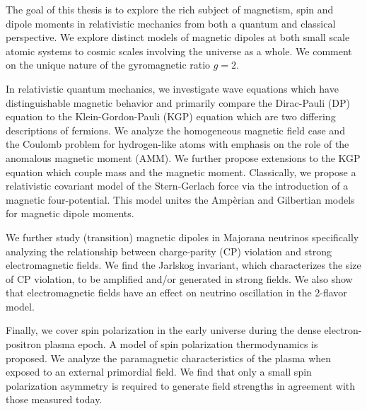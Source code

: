 

The goal of this thesis is to explore the rich subject of magnetism, spin and dipole moments in relativistic mechanics from both a quantum and classical perspective. We explore distinct models of magnetic dipoles at both small scale atomic systems to cosmic scales involving the universe as a whole. We comment on the unique nature of the gyromagnetic ratio $g=2$.

In relativistic quantum mechanics, we investigate wave equations which have distinguishable magnetic behavior and primarily compare the Dirac-Pauli (DP) equation to the Klein-Gordon-Pauli (KGP) equation which are two differing descriptions of fermions. We analyze the homogeneous magnetic field case and the Coulomb problem for hydrogen-like atoms with emphasis on the role of the anomalous magnetic moment (AMM). We further propose extensions to the KGP equation which couple mass and the magnetic moment. Classically, we propose a relativistic covariant model of the Stern-Gerlach force via the introduction of a magnetic four-potential. This model unites the Amp{\`e}rian and Gilbertian models for magnetic dipole moments.

We further study (transition) magnetic dipoles in Majorana neutrinos specifically analyzing the relationship between charge-parity (CP) violation and strong electromagnetic fields. We find the Jarlskog invariant, which characterizes the size of CP violation, to be amplified and/or generated in strong fields. We also show that electromagnetic fields have an effect on neutrino oscillation in the 2-flavor model.

Finally, we cover spin polarization in the early universe during the dense electron-positron plasma epoch. A model of spin polarization thermodynamics is proposed. We analyze the paramagnetic characteristics of the plasma when exposed to an external primordial field. We find that only a small spin polarization asymmetry is required to generate field strengths in agreement with those measured today.